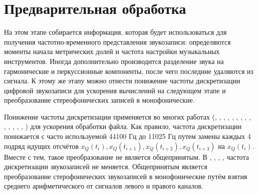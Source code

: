   

\section{Предварительная обработка} \label{sectL_prelim}

На этом этапе собирается информация, которая будет использоваться для получения
частотно-временного представления звукозаписи: определяются моменты начала
метрических долей и частота настройки музыкальных инструментов. Иногда
дополнительно производится разделение звука на гармонические и перкуссионные
компоненты, после чего последние удаляются из сигнала. К этому же этапу можно
отнести понижение частоты дискретизации цифровой звукозаписи для ускорения
вычислений на следующем этапе и преобразование стереофонических записей в
монофонические.

Понижение частоты дискретизации применяется во многих работах
(\cite{Sheh2003}, \cite{Bello2005}, \cite{Lee2006}, \cite{Burgoyne2007},
\cite{Lee2007}, \cite{Papadopoulos2007}, \cite{Mauch2008}, \cite{Khadkevich2009},
\cite{Mauch2009}, \cite{Oudre2009}, \cite{Reed2009}, \cite{Mauch2010},
\cite{Khadkevich2011}, \cite{Ni2011}, \cite{Humphrey2012}) для ускорения
обработки файла. Как правило, частота дискретизации понижается с часто
используемой 44100 Гц до 11025 Гц путем замены каждых 4 подряд идущих
отсчётов $x_Q(t_i), x_Q(t_{i+1}), x_Q(t_{i+2}), x_Q(t_{i+3})$ на $x_Q(t_i)$.
Вместе с тем, такое преобразование не является общепринятым. В \cite{Zhang2008},
\cite{Cho2010}, \cite{Rocher2010}, \cite{Cho2011}, \cite{DeHaas2012} частота
дискретизации звукозаписей не меняется. Общепринятым является преобразование
стерофонических звукозаписей в монофонические путём взятия среднего
арифметического от сигналов левого и правого каналов.

